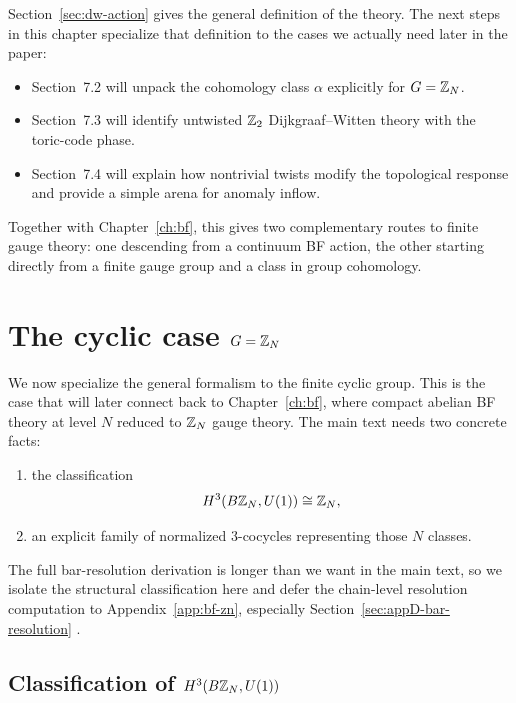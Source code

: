\begin{remark}\label{rem:dw-forward}
Section~\ref{sec:dw-action} gives the general definition of the theory. The next steps in this chapter specialize that definition to the cases we actually need later in the paper:
\begin{itemize}
\item Section~7.2 will unpack the cohomology class $\alpha$ explicitly for $G=\mathbb{Z}_N$.
\item Section~7.3 will identify untwisted $\mathbb{Z}_2$ Dijkgraaf--Witten theory with the toric-code phase.
\item Section~7.4 will explain how nontrivial twists modify the topological response and provide a simple arena for anomaly inflow.
\end{itemize}
Together with Chapter~\ref{ch:bf}, this gives two complementary routes to finite gauge theory: one descending from a continuum BF action, the other starting directly from a finite gauge group and a class in group cohomology.
\end{remark}

\section{The cyclic case \texorpdfstring{$G=\mathbb{Z}_N$}{G=Z\_N}}\label{sec:dw-zn}

We now specialize the general formalism to the finite cyclic group. This is the case that will later connect back to Chapter~\ref{ch:bf}, where compact abelian BF theory at level $N$ reduced to $\mathbb{Z}_N$ gauge theory. The main text needs two concrete facts:
\begin{enumerate}
\item the classification
\begin{equation*}
H^3(B\mathbb{Z}_N,U(1))\cong \mathbb{Z}_N,
\end{equation*}
\item an explicit family of normalized $3$-cocycles representing those $N$ classes.
\end{enumerate}
The full bar-resolution derivation is longer than we want in the main text, so we isolate the structural classification here and defer the chain-level resolution computation to Appendix~\ref{app:bf-zn}, especially Section~\ref{sec:appD-bar-resolution} \cite{DijkgraafWitten1990,Brown1982}.

\subsection{Classification of \texorpdfstring{$H^3(B\mathbb{Z}_N,U(1))$}{H3(BZ\_N,U(1))}}

